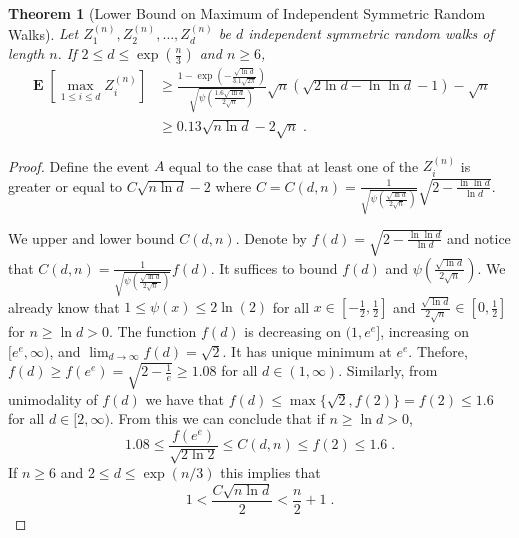 \documentclass{article}
\DeclareMathOperator*{\Exp}{\mathbf{E}}
\newtheorem{theorem}{Theorem}
\begin{document}
\begin{theorem}[Lower Bound on Maximum of Independent Symmetric Random Walks]
\label{theorem:maximum-of-random-walks}
Let $Z^{(n)}_1, Z^{(n)}_2, \dots, Z^{(n)}_d$ be $d$ independent symmetric random walks of length $n$. If $2 \le d \le \exp(\frac{n}{3})$ and $n \ge 6$,
\begin{align*}
\Exp \left[ \max_{1 \le i \le d} Z^{(n)}_i \right]
& \ge \frac{1 - \exp\left(-\frac{\sqrt{\ln d}}{3.1 \sqrt{2\pi}}\right)}{\sqrt{\psi\left(\frac{1.6\sqrt{\ln d}}{2 \sqrt{n}}\right)}} \sqrt{n} \left(\sqrt{2 \ln d -\ln \ln d}-1\right) - \sqrt{n} \\
& \ge 0.13 \sqrt{n \ln d} - 2 \sqrt{n} \; .
\end{align*}
\end{theorem}

\begin{proof}
Define the event $A$ equal to the case that at least one of the $Z^{(n)}_i$ is greater or equal to $C \sqrt{n \ln d}-2$ where
$C = C(d,n) = \frac{1}{\sqrt{\psi\left(\frac{\sqrt{\ln d}}{2 \sqrt{n}}\right)}}\sqrt{2-\frac{\ln \ln d}{\ln d}}$.

We upper and lower bound $C(d,n)$. Denote by $f(d)=\sqrt{2-\frac{\ln \ln d}{\ln d}}$
and notice that $C(d,n) = \frac{1}{\sqrt{\psi\left( \frac{\sqrt{\ln d}}{2 \sqrt{n}}\right)}} f(d)$.  It
suffices to bound $f(d)$ and $\psi( \frac{\sqrt{\ln d}}{2 \sqrt{n}})$.
We already know that $1 \le \psi(x) \le 2 \ln(2)$ for all $x \in [-\frac{1}{2}, \frac{1}{2}]$
and $\frac{\sqrt{\ln d}}{2\sqrt{n}} \in [0,\frac{1}{2}]$ for $n \ge \ln d > 0$.
The function $f(d)$ is decreasing on $(1,e^e]$,
increasing on $[e^e, \infty)$, and $\lim_{d \to \infty} f(d) = \sqrt{2}$. It has
unique minimum at $e^e$. Thefore, $f(d) \ge f(e^e) = \sqrt{2 - \frac{1}{e}} \ge 1.08$
for all $d \in (1,\infty)$.  Similarly, from unimodality of $f(d)$ we have that
$f(d) \le \max\{\sqrt{2}, f(2)\} = f(2) \le 1.6$ for all $d \in [2, \infty)$.
From this we can conclude that if $n \ge \ln d > 0$,
\begin{equation}
\label{equation:bound-on-constant}
1.08 \le \frac{f(e^e)}{\sqrt{2 \ln 2}} \le C(d,n) \le f(2) \le 1.6 \; .
\end{equation}
If $n \ge 6$ and $2 \le d \le \exp(n/3)$ this implies that
\begin{equation}
\label{equation:conditions}
1 < \frac{C \sqrt{n \ln d}}{2} < \frac{n}{2} + 1 \; .
\end{equation}


\end{proof}
\end{document}
